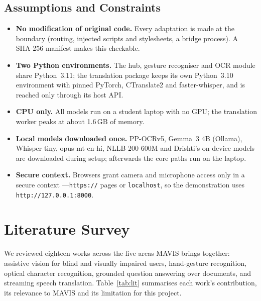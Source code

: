 \documentclass[12pt,singleside,a4paper]{article}
\begin{document}
\subsection{Assumptions and Constraints}
\begin{itemize}[leftmargin=*]
\item \textbf{No modification of original code.} Every adaptation is made at the boundary (routing, injected scripts and stylesheets, a bridge process). A SHA-256 manifest makes this checkable.
\item \textbf{Two Python environments.} The hub, gesture recogniser and OCR module share Python~3.11; the translation package keeps its own Python~3.10 environment with pinned PyTorch, CTranslate2 and faster-whisper, and is reached only through its host API.
\item \textbf{CPU only.} All models run on a student laptop with no GPU; the translation worker peaks at about 1.6\,GB of memory.
\item \textbf{Local models downloaded once.} PP-OCRv5, Gemma~3 4B (Ollama), Whisper tiny, opus-mt-en-hi, NLLB-200 600M and Drishti's on-device models are downloaded during setup; afterwards the core paths run on the laptop.
\item \textbf{Secure context.} Browsers grant camera and microphone access only in a secure context \cite{w3csecure}---\texttt{https://} pages or \texttt{localhost}, so the demonstration uses \texttt{http://127.0.0.1:8000}.
\end{itemize}
\pagebreak

\section{Literature Survey}
We reviewed eighteen works across the five areas MAVIS brings together: assistive vision for blind and visually impaired users, hand-gesture recognition, optical character recognition, grounded question answering over documents, and streaming speech translation. Table~\ref{tab:lit} summarises each work's contribution, its relevance to MAVIS and its limitation for this project.
\end{document}

